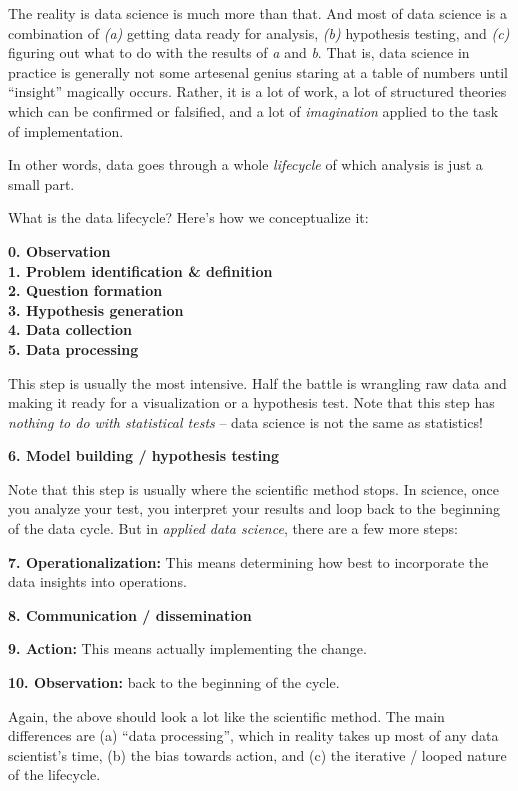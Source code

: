 \documentclass[
]{book}
\begin{document}
The reality is data science is much more than that. And most of data science is a combination of \emph{(a)} getting data ready for analysis, \emph{(b)} hypothesis testing, and \emph{(c)} figuring out what to do with the results of \emph{a} and \emph{b}. That is, data science in practice is generally not some artesenal genius staring at a table of numbers until ``insight'' magically occurs. Rather, it is a lot of work, a lot of structured theories which can be confirmed or falsified, and a lot of \emph{imagination} applied to the task of implementation.

In other words, data goes through a whole \emph{lifecycle} of which analysis is just a small part.

What is the data lifecycle? Here's how we conceptualize it:

\textbf{0. Observation}\\
\textbf{1. Problem identification \& definition}\\
\textbf{2. Question formation}\\
\textbf{3. Hypothesis generation}\\
\textbf{4. Data collection}\\
\textbf{5. Data processing}

This step is usually the most intensive. Half the battle is wrangling raw data and making it ready for a visualization or a hypothesis test. Note that this step has \emph{nothing to do with statistical tests} -- data science is not the same as statistics!

\textbf{6. Model building / hypothesis testing}

Note that this step is usually where the scientific method stops. In science, once you analyze your test, you interpret your results and loop back to the beginning of the data cycle. But in \emph{applied data science}, there are a few more steps:

\textbf{7. Operationalization:} This means determining how best to incorporate the data insights into operations.

\textbf{8. Communication / dissemination}

\textbf{9. Action:} This means actually implementing the change.

\textbf{10. Observation:} back to the beginning of the cycle.

Again, the above should look a lot like the scientific method. The main differences are (a) ``data processing'', which in reality takes up most of any data scientist's time, (b) the bias towards action, and (c) the iterative / looped nature of the lifecycle.
\end{document}
